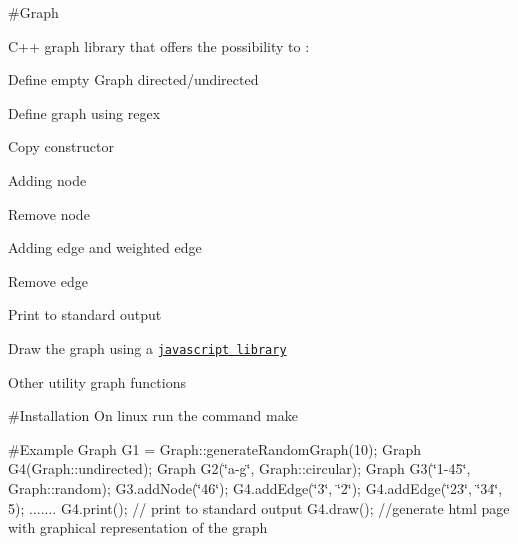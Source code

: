 \#\-Graph

C++ graph library that offers the possibility to \-:


\begin{DoxyItemize}
\item Define empty Graph directed/undirected
\item Define graph using regex
\item Copy constructor
\item Adding node
\item Remove node
\item Adding edge and weighted edge
\item Remove edge
\item Print to standard output
\item Draw the graph using a \href{http://www.graphdracula.net/}{\tt javascript library}
\item Other utility graph functions
\end{DoxyItemize}

\#\-Installation On linux run the command make

\#\-Example Graph G1 = Graph\-::generate\-Random\-Graph(10); Graph G4(\-Graph\-::undirected); Graph G2(\char`\"{}a-\/g\char`\"{}, Graph\-::circular); Graph G3(\char`\"{}1-\/45\char`\"{}, Graph\-::random); G3.\-add\-Node(\char`\"{}46\char`\"{}); G4.\-add\-Edge(\char`\"{}3\char`\"{}, \char`\"{}2\char`\"{}); G4.\-add\-Edge(\char`\"{}23\char`\"{}, \char`\"{}34\char`\"{}, 5); ....... G4.\-print(); // print to standard output G4.\-draw(); //generate html page with graphical representation of the graph 
